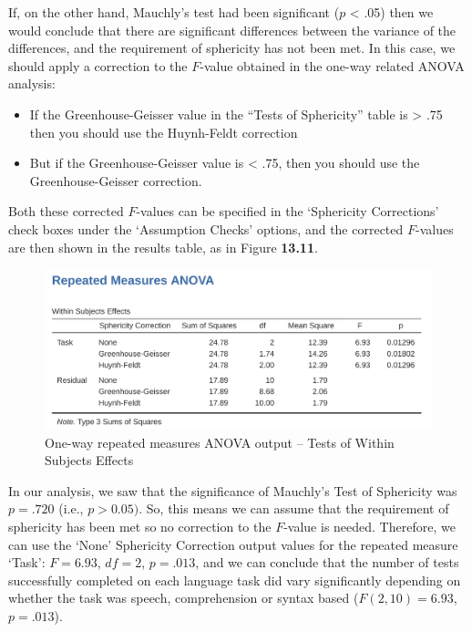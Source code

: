 \documentclass[
  a4paper,
]{book}
\providecommand{\tightlist}{%
  \setlength{\itemsep}{0pt}\setlength{\parskip}{0pt}}\usepackage{longtable,booktabs,array}
\begin{document}
If, on the other hand, Mauchly's test had been significant (\(p\)
\textless{} .05) then we would conclude that there are significant
differences between the variance of the differences, and the requirement
of sphericity has not been met. In this case, we should apply a
correction to the \(F\)-value obtained in the one-way related ANOVA
analysis:

\begin{itemize}
\tightlist
\item
  If the Greenhouse-Geisser value in the ``Tests of Sphericity'' table
  is \textgreater{} .75 then you should use the Huynh-Feldt correction
\item
  But if the Greenhouse-Geisser value is \textless{} .75, then you
  should use the Greenhouse-Geisser correction.
\end{itemize}

Both these corrected \(F\)-values can be specified in the `Sphericity
Corrections' check boxes under the `Assumption Checks' options, and the
corrected \(F\)-values are then shown in the results table, as in Figure
\textbf{13.11}.

\begin{figure}

\includegraphics[width=1\textwidth,height=\textheight]{images/fig13-11.png} \hfill{}

\caption{\label{fig-fig13-11}One-way repeated measures ANOVA output --
Tests of Within Subjects Effects}

\end{figure}

In our analysis, we saw that the significance of Mauchly's Test of
Sphericity was \(p = .720\) (i.e., \(p > 0.05)\). So, this means we can
assume that the requirement of sphericity has been met so no correction
to the \(F\)-value is needed. Therefore, we can use the `None'
Sphericity Correction output values for the repeated measure `Task':
\(F = 6.93\), \(df = 2\), \(p = .013\), and we can conclude that the
number of tests successfully completed on each language task did vary
significantly depending on whether the task was speech, comprehension or
syntax based (\(F(2, 10) = 6.93\), \(p = .013\)).
\end{document}

